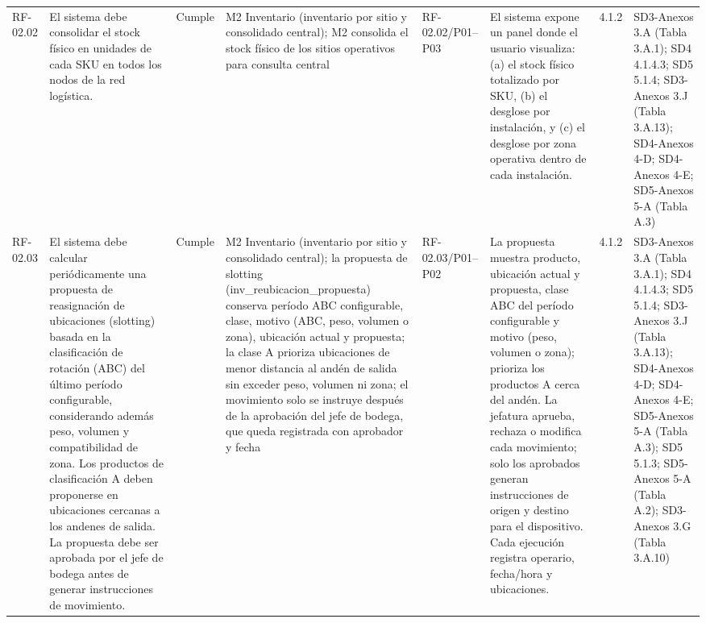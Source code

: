 \documentclass[oficio,firma,final]{lafrox}
\begin{document}
\begin{landscape}
{\begin{longtable}{@{}F{0.054} F{0.173} F{0.061} F{0.191} F{0.106} F{0.180} F{0.067} F{0.168}@{}}
  RF-02.02 & El sistema debe consolidar el stock físico en unidades de cada SKU en todos los nodos de la red logística. & Cumple & M2 Inventario (inventario por sitio y consolidado central); M2 consolida el stock físico de los sitios operativos para consulta central & RF-02.02/\allowbreak{}P01--\allowbreak{}P03 & El sistema expone un panel donde el usuario visualiza: (a) el stock físico totalizado por SKU, (b) el desglose por instalación, y (c) el desglose por zona operativa dentro de cada instalación. & 4.1.2 & SD3-Anexos 3.A (Tabla 3.A.1); SD4 4.1.4.3; SD5 5.1.4; SD3-Anexos 3.J (Tabla 3.A.13); SD4-Anexos 4-D; SD4-Anexos 4-E; SD5-Anexos 5-A (Tabla A.3)  \\
  RF-02.03 & El sistema debe calcular periódicamente una propuesta de reasignación de ubicaciones (slotting) basada en la clasificación de rotación (ABC) del último período configurable, considerando además peso, volumen y compatibilidad de zona. Los productos de clasificación A deben proponerse en ubicaciones cercanas a los andenes de salida. La propuesta debe ser aprobada por el jefe de bodega antes de generar instrucciones de movimiento. & Cumple & M2 Inventario (inventario por sitio y consolidado central); la propuesta de slotting (inv\_reubicacion\_propuesta) conserva período ABC configurable, clase, motivo (ABC, peso, volumen o zona), ubicación actual y propuesta; la clase A prioriza ubicaciones de menor distancia al andén de salida sin exceder peso, volumen ni zona; el movimiento solo se instruye después de la aprobación del jefe de bodega, que queda registrada con aprobador y fecha & RF-02.03/\allowbreak{}P01--\allowbreak{}P02 & La propuesta muestra producto, ubicación actual y propuesta, clase ABC del período configurable y motivo (peso, volumen o zona); prioriza los productos A cerca del andén. La jefatura aprueba, rechaza o modifica cada movimiento; solo los aprobados generan instrucciones de origen y destino para el dispositivo. Cada ejecución registra operario, fecha/hora y ubicaciones. & 4.1.2 & SD3-Anexos 3.A (Tabla 3.A.1); SD4 4.1.4.3; SD5 5.1.4; SD3-Anexos 3.J (Tabla 3.A.13); SD4-Anexos 4-D; SD4-Anexos 4-E; SD5-Anexos 5-A (Tabla A.3); SD5 5.1.3; SD5-Anexos 5-A (Tabla A.2); SD3-Anexos 3.G (Tabla 3.A.10)  \\

\end{longtable}}
\end{landscape}
\end{document}
